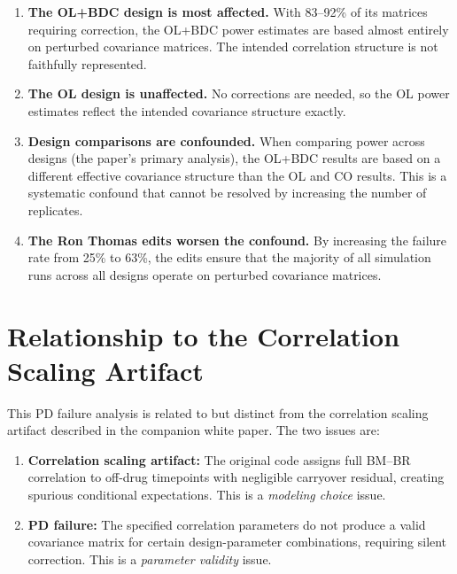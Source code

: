 \documentclass[11pt]{article}
\begin{document}
\begin{enumerate}
\item \textbf{The OL+BDC design is most affected.} With 83--92\%
  of its matrices requiring correction, the OL+BDC power
  estimates are based almost entirely on perturbed covariance
  matrices. The intended correlation structure is not faithfully
  represented.

\item \textbf{The OL design is unaffected.} No corrections are
  needed, so the OL power estimates reflect the intended
  covariance structure exactly.

\item \textbf{Design comparisons are confounded.} When comparing
  power across designs (the paper's primary analysis), the
  OL+BDC results are based on a different effective covariance
  structure than the OL and CO results. This is a systematic
  confound that cannot be resolved by increasing the number
  of replicates.

\item \textbf{The Ron Thomas edits worsen the confound.} By
  increasing the failure rate from 25\% to 63\%, the edits
  ensure that the majority of all simulation runs across all
  designs operate on perturbed covariance matrices.
\end{enumerate}

\section{Relationship to the Correlation Scaling Artifact}

This PD failure analysis is related to but distinct from the
correlation scaling artifact described in the companion white
paper. The two issues are:

\begin{enumerate}
\item \textbf{Correlation scaling artifact:} The original code
  assigns full BM--BR correlation to off-drug timepoints with
  negligible carryover residual, creating spurious conditional
  expectations. This is a \emph{modeling choice} issue.

\item \textbf{PD failure:} The specified correlation parameters
  do not produce a valid covariance matrix for certain
  design-parameter combinations, requiring silent correction.
  This is a \emph{parameter validity} issue.
\end{enumerate}
\end{document}
